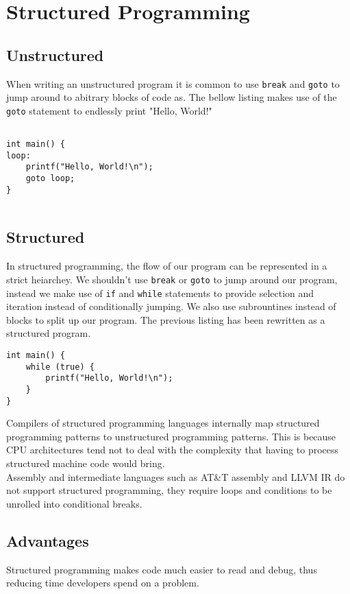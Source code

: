 \documentclass{article}
\begin{document}
\section{Structured Programming}




\subsection{Unstructured}
When writing an unstructured program it is common to use \lstinline{break} and \lstinline{goto} to jump around to abitrary
blocks of code as. The bellow listing makes use of the \lstinline{goto} statement to endlessly print "Hello, World!"

\begin{lstlisting}

int main() {
loop:
	printf("Hello, World!\n");
	goto loop;
}


\end{lstlisting}

\subsection{Structured}
In structured programming, the flow of our program can be represented in a strict heiarchey. We shouldn't use \lstinline{break} or
\lstinline{goto} to jump around our program, instead we make use of \lstinline{if} and \lstinline{while} statements to provide
selection and iteration instead of conditionally jumping. We also use subrountines instead of blocks to split up our program.
The previous listing has been rewritten as a structured program.

\begin{lstlisting}
int main() {
	while (true) {
		printf("Hello, World!\n");
	}
}
\end{lstlisting}
Compilers of structured programming languages internally map structured programming patterns to unstructured programming patterns.
This is because CPU architectures tend not to deal with the complexity that having to process structured machine code
would bring. 
\\
Assembly and intermediate languages such as AT\&T assembly and LLVM IR do not support structured programming, they require
loops and conditions to be unrolled into conditional breaks.

\subsection{Advantages}
Structured programming makes code much easier to read and debug, thus reducing time developers spend on a problem.
\end{document}
